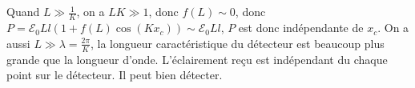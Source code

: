 \documentclass[a4paper,12pt]{book}
\begin{document}
\begin{CJK}{UTF8}{gbsn}
\subsection{}
Quand $L\gg\frac{1}{K}$, on a $LK\gg1$, donc $f(L)\sim0$, donc $P=\mathcal{E}_0Ll\left(1+f(L)\cos(Kx_c)\right)
\sim \boxed{\mathcal{E}_0Ll}$, $P$ est donc indépendante de $x_c$. On a aussi
$L\gg\lambda=\frac{2\pi}{K}$, la longueur caractéristique du détecteur est beaucoup plus grande que la longueur
d'onde. L'éclairement reçu est indépendant du chaque point sur le détecteur. Il peut bien détecter.


\end{CJK}
\end{document}

